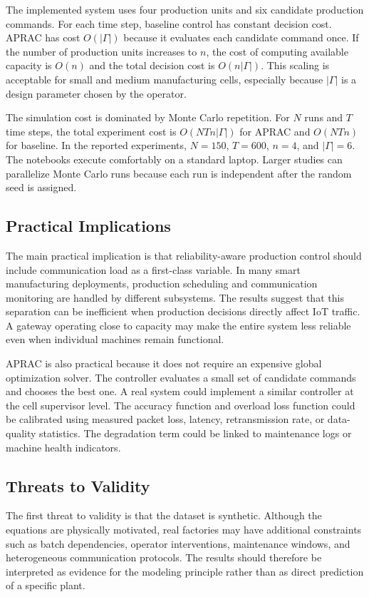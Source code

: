 \documentclass[journal]{IEEEtran}
\begin{document}
The implemented system uses four production units and six candidate production commands. For each time step, baseline control has constant decision cost. APRAC has cost $O(|\Gamma|)$ because it evaluates each candidate command once. If the number of production units increases to $n$, the cost of computing available capacity is $O(n)$ and the total decision cost is $O(n|\Gamma|)$. This scaling is acceptable for small and medium manufacturing cells, especially because $|\Gamma|$ is a design parameter chosen by the operator.

The simulation cost is dominated by Monte Carlo repetition. For $N$ runs and $T$ time steps, the total experiment cost is $O(NTn|\Gamma|)$ for APRAC and $O(NTn)$ for baseline. In the reported experiments, $N=150$, $T=600$, $n=4$, and $|\Gamma|=6$. The notebooks execute comfortably on a standard laptop. Larger studies can parallelize Monte Carlo runs because each run is independent after the random seed is assigned.

\subsection{Practical Implications}

The main practical implication is that reliability-aware production control should include communication load as a first-class variable. In many smart manufacturing deployments, production scheduling and communication monitoring are handled by different subsystems. The results suggest that this separation can be inefficient when production decisions directly affect IoT traffic. A gateway operating close to capacity may make the entire system less reliable even when individual machines remain functional.

APRAC is also practical because it does not require an expensive global optimization solver. The controller evaluates a small set of candidate commands and chooses the best one. A real system could implement a similar controller at the cell supervisor level. The accuracy function and overload loss function could be calibrated using measured packet loss, latency, retransmission rate, or data-quality statistics. The degradation term could be linked to maintenance logs or machine health indicators.

\subsection{Threats to Validity}

The first threat to validity is that the dataset is synthetic. Although the equations are physically motivated, real factories may have additional constraints such as batch dependencies, operator interventions, maintenance windows, and heterogeneous communication protocols. The results should therefore be interpreted as evidence for the modeling principle rather than as direct prediction of a specific plant.
\end{document}
